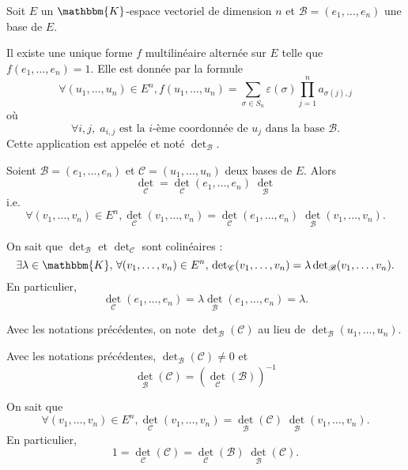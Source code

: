 \begin{defn}
	Soit $E$ un $\mathbbm{K}$-espace vectoriel de dimension $n$ et $\mathcal{B} = (e_1, \ldots, e_n)$ une base de $E$.

	Il existe une unique forme $f$ multilinéaire alternée sur $E$ telle que $f(e_1, \ldots, e_n) = 1$. Elle est donnée par la formule \[
		\forall (u_1, \ldots, u_n) \in E^n,
		f(u_1, \ldots, u_n) = \sum_{\sigma \in S_n} \varepsilon(\sigma) \prod_{j=1}^n a_{\sigma(j), j}
	\] où \[
		\forall i,j,\;a_{i,j} \text{ est la $i$-ème coordonnée de $u_j$ dans la base $\mathcal{B}$.}
	\] Cette application est appelée  et noté $\det_{\mathcal{B}}$.
\end{defn}

\begin{prop}
	Soient $\mathcal{B} = (e_1, \ldots, e_n)$ et $\mathcal{C} = (u_1, \ldots, u_n)$ deux bases de $E$. Alors \[
		\det_\mathcal{C} = \det_\mathcal{C}(e_1, \ldots, e_n)\;\det_\mathcal{B}
	\] i.e. \[
		\forall (v_1, \ldots, v_n) \in E^n,
		\det_\mathcal{C}(v_1, \ldots, v_n) = \det_\mathcal{C}(e_1, \ldots, e_n) \; \det_\mathcal{B}(v_1, \ldots, v_n).
	\]
\end{prop}

\begin{prv}
	On sait que $\det_\mathcal{B}$ et $\det_\mathcal{C}$ sont colinéaires : \[
		\exists \lambda \in \mathbbm{K},\, \forall (v_1, \ldots, v_n) \in E^n,\, \det_\mathcal{C}(v_1, \ldots, v_n) = \lambda \det_\mathcal{B}(v_1, \ldots, v_n).
	\] En particulier, \[
		\det_\mathcal{C}(e_1, \ldots, e_n) = \lambda \det_\mathcal{B}(e_1, \ldots, e_n) = \lambda.
	\]
\end{prv}

\begin{rmk}[notation]
	Avec les notations précédentes, on note $\det_\mathcal{B}(\mathcal{C})$ au lieu de $\det_\mathcal{B}(u_1, \ldots, u_n)$.
\end{rmk}

\begin{crlr}
	Avec les notations précédentes, $\det_\mathcal{B}(\mathcal{C}) \neq 0$ et \[
		\det_\mathcal{B}(\mathcal{C}) = \left( \det_\mathcal{C}(\mathcal{B}) \right)^{-1}
	\]
\end{crlr}

\begin{prv}
	On sait que \[
		\forall (v_1, \ldots, v_n) \in E^n, \det_\mathcal{C}(v_1, \ldots, v_n) = \det_\mathcal{B}(\mathcal{C}) \;\det_\mathcal{B}(v_1, \ldots, v_n).
	\] En particulier, \[
		1 = \det_\mathcal{C}(\mathcal{C}) = \det_\mathcal{C}(\mathcal{B}) \;\det_\mathcal{B}(\mathcal{C}).
	\]
\end{prv}

